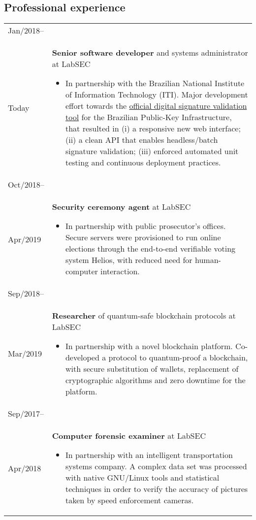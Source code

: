 \documentclass[12pt]{article}
\makeatletter
\newenvironment{sidetable}
  {\newcolumntype{L}{>{\bf \raggedright}p{0.14\textwidth}}
   \newcolumntype{R}{p{0.80\textwidth}}
   \begin{tabular}{@{\hspace{0mm}}LR}}
  {\end{tabular}}
\newenvironment{contenttable}[1]
  {\subsection*{#1}
   \begin{sidetable}}
  {\end{sidetable}}
\makeatother
\begin{document}
\begin{contenttable}{Professional experience}
  Jan/2018-- \\ Today & \textbf{Senior software developer} and systems
    administrator at LabSEC
  \begin{itemize}
    \item In partnership with the Brazilian National Institute of Information
        Technology (ITI). Major development effort towards the
          \href{https://verificador.iti.gov.br}{official digital signature
          validation tool} for the Brazilian Public-Key Infrastructure, that
          resulted in (i) a responsive new web interface; (ii) a clean API that
          enables headless/batch signature validation; (iii) enforced automated
          unit testing and continuous deployment practices.
  \end{itemize} \\

  Oct/2018-- \\ Apr/2019 & \textbf{Security ceremony agent} at LabSEC
  \begin{itemize}
    \item In partnership with public prosecutor's offices. Secure servers were
        provisioned to run online elections through the end-to-end verifiable
          voting system Helios, with reduced need for human-computer
          interaction.
  \end{itemize} \\

  Sep/2018-- \\ Mar/2019 & \textbf{Researcher} of quantum-safe blockchain
    protocols at LabSEC
  \begin{itemize}
    \item In partnership with a novel blockchain platform. Co-developed a
        protocol to quantum-proof a blockchain, with secure substitution of
          wallets, replacement of cryptographic algorithms and zero downtime
          for the platform.
  \end{itemize} \\

  Sep/2017-- \\ Apr/2018 & \textbf{Computer forensic examiner} at LabSEC
  \begin{itemize}
    \item In partnership with an intelligent transportation systems company. A
        complex data set was processed with native GNU/Linux tools and
          statistical techniques in order to verify the accuracy of pictures
          taken by speed enforcement cameras.
  \end{itemize} \\


\end{contenttable}
\end{document}
